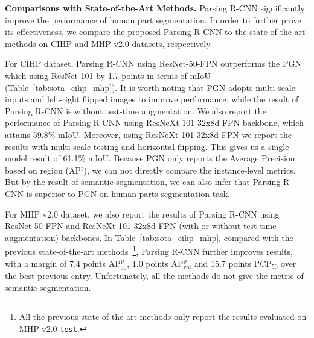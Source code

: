 \documentclass[10pt,twocolumn,letterpaper]{article}
\begin{document}
\vspace{6pt}
\noindent\textbf{Comparisons with State-of-the-Art Methods.} Parsing R-CNN significantly improve the performance of human part segmentation. In order to further prove its effectiveness, we compare the proposed Parsing R-CNN to the state-of-the-art methods on CIHP and MHP v2.0 datasets, respectively.

For CIHP dataset, Parsing R-CNN using ResNet-50-FPN outperforms the PGN~\cite{Gong_eccv2018_pgn} which using ResNet-101 by 1.7 points in terms of mIoU (Table~\ref{tab:sota_cihp_mhp}). It is worth noting that PGN adopts multi-scale inputs and left-right flipped images to improve performance, while the result of Parsing R-CNN is without test-time augmentation. We also report the performance of Parsing R-CNN using ResNeXt-101-32x8d-FPN backbone, which attains 59.8\% mIoU. Moreover, using ResNeXt-101-32x8d-FPN we report the results with multi-scale testing and horizontal flipping. This gives us a single model result of 61.1\% mIoU. Because PGN only reports the Average Precision based on region (AP$^\text{r}$), we can not directly compare the instance-level metrics. But by the result of semantic segmentation, we can also infer that Parsing R-CNN is superior to PGN on human parts segmentation task.

For MHP v2.0 dataset, we also report the results of Parsing R-CNN using ResNet-50-FPN and ResNeXt-101-32x8d-FPN (with or without test-time augmentation) backbones. In Table~\ref{tab:sota_cihp_mhp}, compared with the previous state-of-the-art methods~\cite{He_iccv2017_maskrcnn, Li_arxiv2017_mhparser, Zhao_mm2018_mhpv2}\footnote{\fontsize{7pt}{1em}All the previous state-of-the-art methods only report the results evaluated on MHP v2.0 \texttt{test}.}, Parsing R-CNN further improves results, with a margin of 7.4 points AP$^\text{p}_\text{50}$, 1.0 points AP$^\text{p}_\text{vol}$ and 15.7 points PCP$_\text{50}$ over the best previous entry. Unfortunately, all the methods do not give the metric of semantic segmentation.
\end{document}
